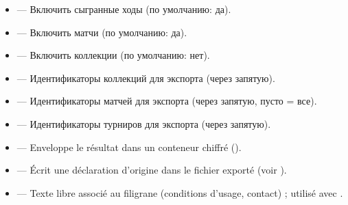 \documentclass[letterpaper,10pt,russian]{sphinxmanual}
\begin{document}
\begin{itemize}
\item {} 
\sphinxAtStartPar
{} — Включить сыгранные ходы (по умолчанию: да).

\item {} 
\sphinxAtStartPar
{} — Включить матчи (по умолчанию: да).

\item {} 
\sphinxAtStartPar
{} — Включить коллекции (по умолчанию: нет).

\item {} 
\sphinxAtStartPar
{} — Идентификаторы коллекций для экспорта (через запятую).

\item {} 
\sphinxAtStartPar
{} — Идентификаторы матчей для экспорта (через запятую, пусто = все).

\item {} 
\sphinxAtStartPar
{} — Идентификаторы турниров для экспорта (через запятую).

\item {} 
\sphinxAtStartPar
{} — Enveloppe le résultat dans un conteneur chiffré ().

\item {} 
\sphinxAtStartPar
{} — Écrit une déclaration d’origine  dans le fichier
exporté (voir {\hyperref[\detokenize{manuel:diffusion-controlee}]{}}).

\item {} 
\sphinxAtStartPar
{} — Texte libre associé au filigrane (conditions
d’usage, contact) ; utilisé avec .

\end{itemize}

\sphinxAtStartPar
{}
\end{document}
